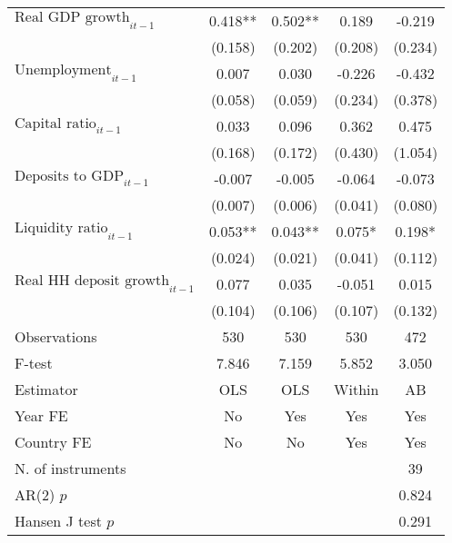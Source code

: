 \begin{longtable}{m{8cm}*{4}{c}}
$\text{Real GDP growth}_{it-1}$&       0.418** &       0.502** &       0.189   &      -0.219   \\
                    &     (0.158)   &     (0.202)   &     (0.208)   &     (0.234)   \\
$\text{Unemployment}_{it-1}$&       0.007   &       0.030   &      -0.226   &      -0.432   \\
                    &     (0.058)   &     (0.059)   &     (0.234)   &     (0.378)   \\
$\text{Capital ratio}_{it-1}$&       0.033   &       0.096   &       0.362   &       0.475   \\
                    &     (0.168)   &     (0.172)   &     (0.430)   &     (1.054)   \\
$\text{Deposits to GDP}_{it-1}$&      -0.007   &      -0.005   &      -0.064   &      -0.073   \\
                    &     (0.007)   &     (0.006)   &     (0.041)   &     (0.080)   \\
$\text{Liquidity ratio}_{it-1}$&       0.053** &       0.043** &       0.075*  &       0.198*  \\
                    &     (0.024)   &     (0.021)   &     (0.041)   &     (0.112)   \\
$\text{Real HH deposit growth}_{it-1}$&       0.077   &       0.035   &      -0.051   &       0.015   \\
                    &     (0.104)   &     (0.106)   &     (0.107)   &     (0.132)   \\
\midrule
Observations        &         530   &         530   &         530   &         472   \\
F-test              &       7.846   &       7.159   &       5.852   &       3.050   \\
Estimator           &         OLS   &         OLS   &      Within   &          AB   \\
Year FE             &          No   &         Yes   &         Yes   &         Yes   \\
Country FE          &          No   &          No   &         Yes   &         Yes   \\
N. of instruments   &               &               &               &          39   \\
AR(2) \(p\)         &               &               &               &       0.824   \\
Hansen J test \(p\) &               &               &               &       0.291   \\

\end{longtable}
